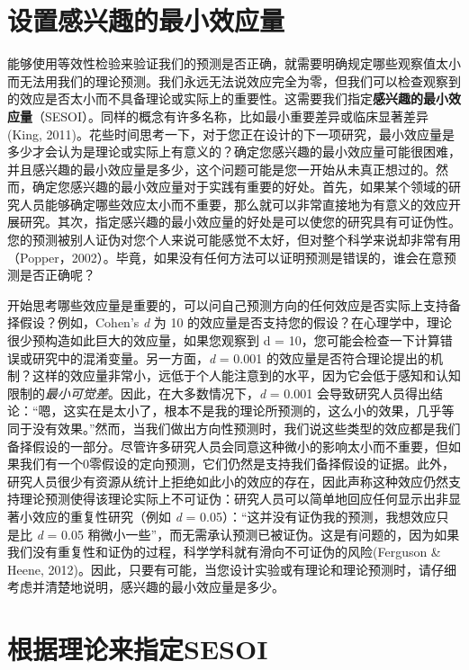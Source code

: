 \documentclass[
  letterpaper,
  DIV=11,
  numbers=noendperiod]{scrreprt}
\begin{document}
\hypertarget{sec-sesoi}{%
\section{设置感兴趣的最小效应量}\label{sec-sesoi}}

能够使用等效性检验来验证我们的预测是否正确，就需要明确规定哪些观察值太小而无法用我们的理论预测。我们永远无法说效应完全为零，但我们可以检查观察到的效应是否太小而不具备理论或实际上的重要性。这需要我们指定\textbf{感兴趣的最小效应量}（SESOI）。同样的概念有许多名称，比如最小重要差异或临床显著差异(King,
2011)。花些时间思考一下，对于您正在设计的下一项研究，最小效应量是多少才会认为是理论或实际上有意义的？确定您感兴趣的最小效应量可能很困难，并且感兴趣的最小效应量是多少，这个问题可能是您一开始从未真正想过的。然而，确定您感兴趣的最小效应量对于实践有重要的好处。首先，如果某个领域的研究人员能够确定哪些效应太小而不重要，那么就可以非常直接地为有意义的效应开展研究。其次，指定感兴趣的最小效应量的好处是可以使您的研究具有可证伪性。您的预测被别人证伪对您个人来说可能感觉不太好，但对整个科学来说却非常有用（Popper，2002）。毕竟，如果没有任何方法可以证明预测是错误的，谁会在意预测是否正确呢？

开始思考哪些效应量是重要的，可以问自己预测方向的任何效应是否实际上支持备择假设？例如，Cohen's
\emph{d} 为 10
的效应量是否支持您的假设？在心理学中，理论很少预构造如此巨大的效应量，如果您观察到
d = 10，您可能会检查一下计算错误或研究中的混淆变量。另一方面，\emph{d} =
0.001
的效应量是否符合理论提出的机制？这样的效应量非常小，远低于个人能注意到的水平，因为它会低于感知和认知限制的\emph{最小可觉差}。因此，在大多数情况下，\emph{d}
= 0.001
会导致研究人员得出结论：``嗯，这实在是太小了，根本不是我的理论所预测的，这么小的效果，几乎等同于没有效果。''然而，当我们做出方向性预测时，我们说这些类型的效应都是我们备择假设的一部分。尽管许多研究人员会同意这种微小的影响太小而不重要，但如果我们有一个0零假设的定向预测，它们仍然是支持我们备择假设的证据。此外，研究人员很少有资源从统计上拒绝如此小的效应的存在，因此声称这种效应仍然支持理论预测使得该理论实际上不可证伪：研究人员可以简单地回应任何显示出非显著小效应的重复性研究（例如
\emph{d} = 0.05）：``这并没有证伪我的预测，我想效应只是比 \emph{d} =
0.05
稍微小一些''，而无需承认预测已被证伪。这是有问题的，因为如果我们没有重复性和证伪的过程，科学学科就有滑向不可证伪的风险(Ferguson
\& Heene,
2012)。因此，只要有可能，当您设计实验或有理论和理论预测时，请仔细考虑并清楚地说明，感兴趣的最小效应量是多少。

\hypertarget{ux6839ux636eux7406ux8bbaux6765ux6307ux5b9asesoi}{%
\section{根据理论来指定SESOI}\label{ux6839ux636eux7406ux8bbaux6765ux6307ux5b9asesoi}}
\end{document}
